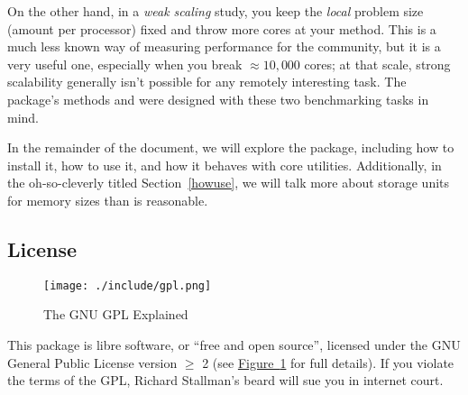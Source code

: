 On the other hand, in a \emph{weak scaling} study, you 
keep the \emph{local} problem size (amount per processor) fixed and throw more 
cores at your method.  This is a much less known way of measuring performance 
for the  community, but it is a very useful one, especially when 
you break $\approx 10,000$ cores; at that scale, strong scalability generally 
isn't possible for any remotely interesting task.  The  package's 
methods  and  were designed with these two 
benchmarking tasks in mind.

In the remainder of the document, we will explore the  package, 
including how to install it, how to use it, and how it behaves with core 
 utilities.  Additionally, in the oh-so-cleverly titled
Section~\ref{howuse}, we will talk more about storage units for memory sizes 
than is reasonable.


\subsection{License}

\begin{figure}[th]
  \centering
  \texttt{[image: ./include/gpl.png]}
  \caption{The GNU GPL Explained}
  \label{fig:gnu}
\end{figure}

This package is libre software, or ``free and open source'', licensed under the 
GNU General Public License version $\geq$ 2 (see 
\hyperref[fig:gnu]{Figure~\ref{fig:gnu}} for full details).  If you 
violate the terms of the GPL, Richard Stallman's beard will sue you in 
internet court.